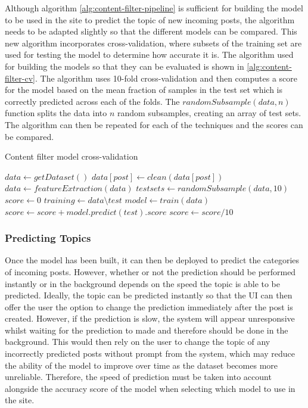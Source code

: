 Although algorithm \ref{alg:content-filter-pipeline} is sufficient for building the model to be used in the site to predict the topic of new incoming posts, the algorithm needs to be adapted slightly so that the different models can be compared. This new algorithm incorporates cross-validation, where subsets of the training set are used for testing the model to determine how accurate it is. The algorithm used for building the models so that they can be evaluated is shown in \ref{alg:content-filter-cv}. The algorithm uses 10-fold cross-validation and then computes a score for the model based on the mean fraction of samples in the test set which is correctly predicted across each of the folds. The $randomSubsample(data,n)$ function splits the data into $n$ random subsamples, creating an array of test sets. The algorithm can then be repeated for each of the techniques and the scores can be compared.

\begin{algorithm}
\caption{Content filter model cross-validation}
\label{alg:content-filter-cv}
\begin{algorithmic}[1]
\State $data\gets getDataset()$
	\State $data[post]\gets clean(data[post])$
\EndFor
\State $data\gets featureExtraction(data)$
\State $testsets\gets randomSubsample(data, 10)$
\State $score\gets 0$
	\State $training\gets data\setminus test$
	\State $model\gets train(data)$
	\State $score\gets score + model.predict(test).score$
\EndFor
\State $score\gets score/10$
\end{algorithmic}
\end{algorithm}

\subsubsection{Predicting Topics}
Once the model has been built, it can then be deployed to predict the categories of incoming posts. However, whether or not the prediction should be performed instantly or in the background depends on the speed the topic is able to be predicted. Ideally, the topic can be predicted instantly so that the UI can then offer the user the option to change the prediction immediately after the post is created. However, if the prediction is slow, the system will appear unresponsive whilst waiting for the prediction to made and therefore should be done in the background. This would then rely on the user to change the topic of any incorrectly predicted posts without prompt from the system, which may reduce the ability of the model to improve over time as the dataset becomes more unreliable. Therefore, the speed of prediction must be taken into account alongside the accuracy score of the model when selecting which model to use in the site.


